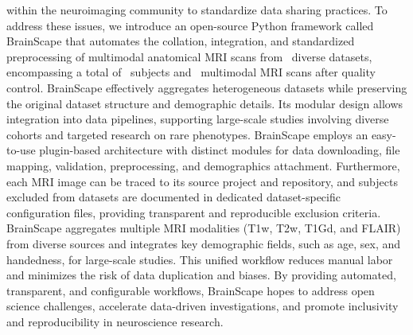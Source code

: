 within the neuroimaging community to standardize data sharing practices. 
To address these issues, we introduce an open-source Python framework called BrainScape that automates the collation, integration, and standardized preprocessing of multimodal anatomical MRI scans from \NumDatasets\ diverse datasets, 
encompassing a total of \TotalSubjectsIncludedAfterInspectionCount\ subjects and \TotalNumMRIs\ multimodal MRI scans after quality control. 
BrainScape effectively aggregates heterogeneous datasets while preserving the original dataset structure and demographic details.
Its modular design allows integration into data pipelines, supporting large-scale studies involving diverse cohorts and targeted research on rare phenotypes. 
BrainScape employs an easy-to-use plugin-based architecture with distinct modules for data downloading, file mapping, validation, preprocessing, and demographics attachment. 
Furthermore, each MRI image can be traced to its source project and repository, and subjects excluded from datasets are documented in dedicated dataset-specific configuration files, 
providing transparent and reproducible exclusion criteria.
BrainScape aggregates multiple MRI modalities (T1w, T2w, T1Gd, and FLAIR) from diverse sources and integrates key demographic fields, such as age, sex, and handedness, for large-scale studies.
This unified workflow reduces manual labor and minimizes the risk of data duplication and biases. 
By providing automated, transparent, and configurable workflows, 
BrainScape hopes to address open science challenges, accelerate data-driven investigations, and promote inclusivity and reproducibility in neuroscience research. 
